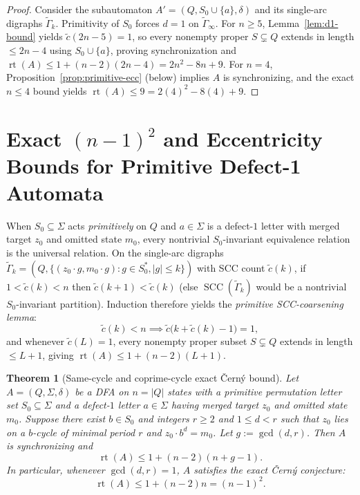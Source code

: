 \documentclass[11pt,a4paper]{article}
\newtheorem{theorem}{Theorem}[section]
\theoremstyle{definition}
\theoremstyle{remark}
\newcommand{\rt}{\operatorname{rt}}
\newcommand{\SCC}{\operatorname{SCC}}
\begin{document}
\begin{proof}
Consider the subautomaton $A' = (Q, S_0 \cup \{a\}, \delta)$ and its single-arc digraphs $\widetilde{\Gamma}_k$. Primitivity of $S_0$ forces $d = 1$ on $\widetilde{\Gamma}_\infty$. For $n \ge 5$, Lemma~\ref{lem:d1-bound} yields $\widetilde{c}(2n - 5) = 1$, so every nonempty proper $S \subsetneq Q$ extends in length $\le 2n - 4$ using $S_0 \cup \{a\}$, proving synchronization and $\rt(A) \le 1 + (n - 2)(2n - 4) = 2n^2 - 8n + 9$. For $n = 4$, Proposition~\ref{prop:primitive-ecc} (below) implies $A$ is synchronizing, and the exact $n \le 4$ bound yields $\rt(A) \le 9 = 2(4)^2 - 8(4) + 9$.
\end{proof}

\section{Exact $(n - 1)^2$ and Eccentricity Bounds for Primitive Defect-1 Automata}\label{sec:primitive}

When $S_0 \subseteq \Sigma$ acts \emph{primitively} on $Q$ and $a \in \Sigma$ is a defect-$1$ letter with merged target $z_0$ and omitted state $m_0$, every nontrivial $S_0$-invariant equivalence relation is the universal relation. On the single-arc digraphs $\widetilde{\Gamma}_k = (Q, \{(z_0 \cdot g, m_0 \cdot g) : g \in S_0^*, |g| \le k\})$ with SCC count $\widetilde{c}(k)$, if $1 < \widetilde{c}(k) < n$ then $\widetilde{c}(k + 1) < \widetilde{c}(k)$ (else $\SCC(\widetilde{\Gamma}_k)$ would be a nontrivial $S_0$-invariant partition). Induction therefore yields the \emph{primitive SCC-coarsening lemma}:
\begin{equation}\label{eq:prim-coarsen}
  \widetilde{c}(k) < n \implies \widetilde{c}\bigl(k + \widetilde{c}(k) - 1\bigr) = 1,
\end{equation}
and whenever $\widetilde{c}(L) = 1$, every nonempty proper subset $S \subsetneq Q$ extends in length $\le L + 1$, giving $\rt(A) \le 1 + (n - 2)(L + 1)$.

\begin{theorem}[Same-cycle and coprime-cycle exact \v{C}ern\'y bound]\label{thm:primitive-coprime}
Let $A = (Q, \Sigma, \delta)$ be a DFA on $n = |Q|$ states with a primitive permutation letter set $S_0 \subseteq \Sigma$ and a defect-$1$ letter $a \in \Sigma$ having merged target $z_0$ and omitted state $m_0$. Suppose there exist $b \in S_0$ and integers $r \ge 2$ and $1 \le d < r$ such that $z_0$ lies on a $b$-cycle of minimal period $r$ and $z_0 \cdot b^d = m_0$. Let $g := \gcd(d, r)$. Then $A$ is synchronizing and
\[
  \rt(A) \le 1 + (n - 2)(n + g - 1).
\]
In particular, whenever $\gcd(d, r) = 1$, $A$ satisfies the exact \v{C}ern\'y conjecture:
\[
  \rt(A) \le 1 + (n - 2)n = (n - 1)^2.
\]
\end{theorem}
\end{document}
